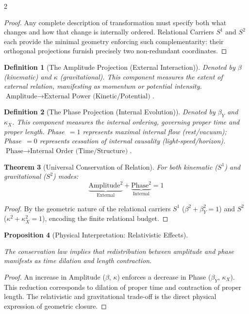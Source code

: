 \documentclass[10pt, a4paper]{article}
\newtheorem{theorem}{Theorem}[section]
\newtheorem{definition}[theorem]{Definition}
\newtheorem{proposition}[theorem]{Proposition}
\begin{document}
\begin{multicols}{2}
\begin{proof}
Any complete description of transformation must specify both what changes and how that change is internally ordered. Relational Carriers $S^1$ and $S^2$ each provide the minimal geometry enforcing such complementarity: their orthogonal projections furnish precisely two non-redundant coordinates.
\end{proof}

\begin{definition}[The Amplitude Projection (External Interaction)]
Denoted by $\beta$ (kinematic) and $\kappa$ (gravitational). This component measures the \textit{extent of external relation}, manifesting as momentum or potential intensity.
$\text{Amplitude} \to \text{External Power (Kinetic/Potential)}$.
\end{definition}

\begin{definition}[The Phase Projection (Internal Evolution)]
Denoted by $\beta_Y$ and $\kappa_X$. This component measures the \textit{internal ordering}, governing proper time and proper length. Phase~$=1$ represents maximal internal flow (rest/vacuum); Phase~$=0$ represents cessation of internal causality (light-speed/horizon).
$\text{Phase} \to \text{Internal Order (Time/Structure)}$.
\end{definition}

\begin{theorem}[Universal Conservation of Relation]
For both kinematic ($S^1$) and gravitational ($S^2$) modes:
\begin{equation}
\underbrace{\text{Amplitude}^2}_{\text{External}} + \underbrace{\text{Phase}^2}_{\text{Internal}} = 1
\end{equation}
\end{theorem}

\begin{proof}
By the geometric nature of the relational carriers $S^1$ ($\beta^2+\beta_Y^2=1$) and $S^2$ ($\kappa^2+\kappa_X^2=1$), encoding the finite relational budget.
\end{proof}

\begin{proposition}[Physical Interpretation: Relativistic Effects]
\hypertarget{prop:relativity}{}\label{prop:relativity}
The conservation law implies that redistribution between amplitude and phase manifests as time dilation and length contraction.
\end{proposition}

\begin{proof}
An increase in Amplitude ($\beta$, $\kappa$) enforces a decrease in Phase ($\beta_Y$, $\kappa_X$). This reduction corresponds to dilation of proper time and contraction of proper length. The relativistic and gravitational trade-off is the direct physical expression of geometric closure.
\end{proof}



\end{multicols}
\end{document}
